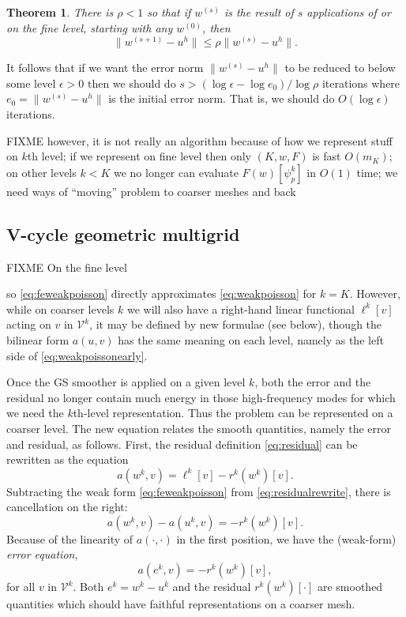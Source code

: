 \documentclass[letterpaper,final,12pt,reqno]{amsart}
\newtheorem*{theorem}{Theorem}
\newcommand{\eps}{\epsilon}
\numberwithin{equation}{section}
\numberwithin{figure}{section}
\numberwithin{table}{section}
\begin{document}
\begin{theorem} \cite[Theorem 3.10]{GraeserKornhuber2009}  There is $\rho<1$ so that if $w^{(s)}$ is the result of $s$ applications of  or  on the fine level, starting with any $w^{(0)}$, then
\begin{equation}
  \|w^{(s+1)} - u^h\| \le \rho \|w^{(s)} - u^h\|.  \label{eq:mscconvergence}
\end{equation}
\end{theorem}

\noindent It follows that if we want the error norm $\|w^{(s)}-u^h\|$ to be reduced to below some level $\eps>0$ then we should do $s>(\log\eps - \log e_0)/\log \rho$ iterations where $e_0=\|w^{(s)}-u^h\|$ is the initial error norm.  That is, we should do $O(\log\eps)$ iterations.

FIXME however, it is not really an algorithm because of how we represent stuff on $k$th level; if we represent on fine level then only $(K,w,F)$ is fast $O(m_K)$; on other levels $k<K$ we no longer can evaluate $F(w)[\psi_p^k]$ in $O(1)$ time; we need ways of ``moving'' problem to coarser meshes and back


\subsection*{V-cycle geometric multigrid}  FIXME On the fine level

so \eqref{eq:feweakpoisson} directly approximates \eqref{eq:weakpoisson} for $k=K$.  However, while on coarser levels $k$ we will also have a right-hand linear functional $\ell^k[v]$ acting on $v$ in $\mathcal{V}^k$, it may be defined by new formulae (see below), though the bilinear form $a(u,v)$ has the same meaning on each level, namely as the left side of \eqref{eq:weakpoissonearly}.

Once the GS smoother is applied on a given level $k$, both the error and the residual no longer contain much energy in those high-frequency modes for which we need the $k$th-level representation.  Thus the problem can be represented on a coarser level.  The new equation relates the smooth quantities, namely the error and residual, as follows.  First, the residual definition \eqref{eq:residual} can be rewritten as the equation
\begin{equation}
  a(w^k,v) = \ell^k[v] - r^k(w^k)[v].  \label{eq:residualrewrite}
\end{equation}
Subtracting the weak form \eqref{eq:feweakpoisson} from \eqref{eq:residualrewrite}, there is cancellation on the right:
\begin{equation}
  a(w^k,v) - a(u^k,v) = - r^k(w^k)[v].  \label{eq:errorequationearly}
\end{equation}
Because of the linearity of $a(\cdot,\cdot)$ in the first position, we have the (weak-form) \emph{error equation},
\begin{equation}
  a(e^k,v) = - r^k(w^k)[v],  \label{eq:errorequation}
\end{equation}
for all $v$ in $\mathcal{V}^k$.  Both $e^k=w^k-u^k$ and the residual $r^k(w^k)[\cdot]$ are smoothed quantities which should have faithful representations on a coarser mesh.
\end{document}
